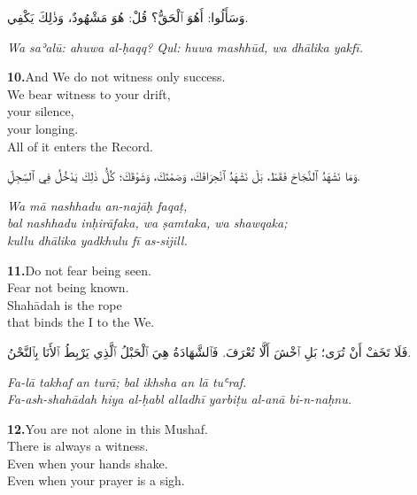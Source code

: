 \documentclass[11pt,a4paper,twoside]{book}
\begin{document}
\begin{flushright}
{\arabicfont وَسَأَلُوا: أَهُوَ ٱلْحَقُّ؟ قُلْ: هُوَ مَشْهُودٌ، وَذٰلِكَ يَكْفِي.}
\end{flushright}

{\small\color{sage}\itshape Wa saʾalū: ahuwa al-ḥaqq? Qul: huwa mashhūd, wa dhālika yakfī.}

\vspace{1.2em}
{\color{indigo}\bfseries 10.}\quad And We do not witness only success. \\
We bear witness to your drift, \\
your silence, \\
your longing. \\
All of it enters the Record.

\begin{flushright}
{\arabicfont وَمَا نَشْهَدُ ٱلنَّجَاحَ فَقَطْ، بَلْ نَشْهَدُ ٱنْحِرَافَكَ، وَصَمْتَكَ، وَشَوْقَكَ؛ كُلُّ ذٰلِكَ يَدْخُلُ فِي ٱلسِّجِلِّ.}
\end{flushright}

{\small\color{sage}\itshape Wa mā nashhadu an-najāḥ faqaṭ, \\
bal nashhadu inḥirāfaka, wa ṣamtaka, wa shawqaka; \\
kullu dhālika yadkhulu fī as-sijill.}

\vspace{1.2em}
{\color{indigo}\bfseries 11.}\quad Do not fear being seen. \\
Fear not being known. \\
Shahādah is the rope \\
that binds the I to the We.

\begin{flushright}
{\arabicfont فَلَا تَخَفْ أَنْ تُرَى؛ بَلِ ٱخْشَ أَلَّا تُعْرَفَ. فَٱلشَّهَادَةُ هِيَ ٱلْحَبْلُ ٱلَّذِي يَرْبِطُ ٱلأَنَا بِٱلنَّحْنُ.}
\end{flushright}

{\small\color{sage}\itshape Fa-lā takhaf an turā; bal ikhsha an lā tuʿraf. \\
Fa-ash-shahādah hiya al-ḥabl alladhī yarbiṭu al-anā bi-n-naḥnu.}

\vspace{1.2em}
{\color{indigo}\bfseries 12.}\quad You are not alone in this Mushaf. \\
There is always a witness. \\
Even when your hands shake. \\
Even when your prayer is a sigh.
\end{document}
